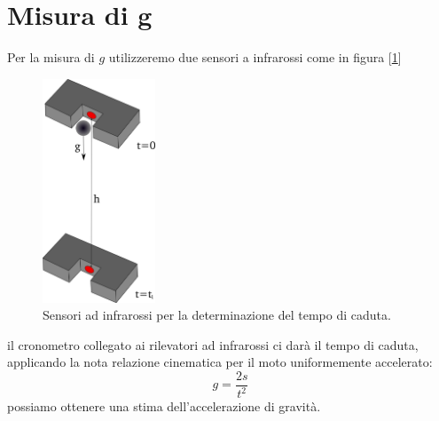 \documentclass[a4paper,10pt,oneside]{article}
\begin{document}
\section{Misura di g}


Per la misura di $g$ utilizzeremo due sensori a infrarossi come in figura [\ref{fig:gravita_1}]
\begin{figure}[H]
 \centering
 \includegraphics[width=0.3\textwidth]{./Immagini/gravita.png}
 \caption{Sensori ad infrarossi per la determinazione del tempo di caduta.}
 \label{fig:gravita_1}
\end{figure}
il cronometro collegato ai rilevatori ad infrarossi ci darà il tempo di caduta, applicando la nota relazione cinematica per il moto uniformemente accelerato:
\begin{equation}
 g=\frac{2s}{t^2}
\end{equation}
possiamo ottenere una stima dell'accelerazione di gravità.
\end{document}
